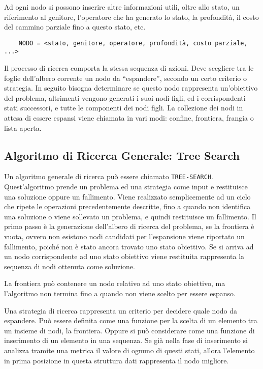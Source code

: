 \documentclass{article}
\numberwithin{equation}{subsection}
\begin{document}
Ad ogni nodo si possono inserire altre informazioni utili, oltre allo stato, un riferimento al 
genitore, l'operatore che ha generato lo stato, la profondità, il costo del cammino parziale 
fino a questo stato, etc. 
\begin{verbatim}
    NODO = <stato, genitore, operatore, profondità, costo parziale, ...>
\end{verbatim}

Il processo di ricerca comporta la stessa sequenza di azioni. Deve scegliere tra le foglie 
dell'albero corrente un nodo da ``espandere'', secondo un certo criterio o strategia. 
In seguito bisogna determinare se questo nodo rappresenta un'obiettivo del problema, 
altrimenti vengono generati i suoi nodi figli, ed i corrispondenti stati successori, e tutte 
le componenti dei nodi figli. 
La collezione dei nodi in attesa di essere espansi viene chiamata in vari modi: confine, 
frontiera, frangia o lista aperta. 

\subsection{Algoritmo di Ricerca Generale: Tree Search}

Un algoritmo generale di ricerca può essere chiamato \color{red}\verb|TREE-SEARCH|\color{black}. Quest'algoritmo 
prende un problema ed una strategia come input e restituisce una soluzione oppure un fallimento. 
Viene realizzato semplicemente ad un ciclo che ripete le operazioni precedentemente descritte, 
fino a quando non identifica una soluzione o viene sollevato un problema, e quindi restituisce 
un fallimento. Il primo passo è la generazione dell'albero di ricerca del problema, se la frontiera è 
vuota, ovvero non esistono nodi candidati per l'espansione viene riportato un fallimento, poiché 
non è stato ancora trovato uno stato obiettivo. Se si arriva ad un nodo corrispondente ad uno 
stato obiettivo viene restituita rappresenta la sequenza di nodi ottenuta come soluzione. 

La frontiera può contenere un nodo relativo ad uno stato obiettivo, ma l'algoritmo non 
termina fino a quando non viene scelto per essere espanso. 


Una strategia di ricerca rappresenta un criterio per decidere quale nodo da espandere. 
Può essere definita come una funzione per la scelta di un elemento tra un insieme di nodi, la 
frontiera. Oppure si può considerare come una funzione di inserimento di un elemento in una 
sequenza. Se già nella fase di inserimento si analizza tramite una metrica il valore di ognuno 
di questi stati, allora l'elemento in prima posizione in questa struttura dati rappresenta il 
nodo migliore. 
\end{document}
